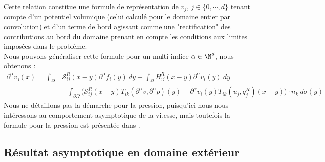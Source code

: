Cette relation constitue une formule de représentation de $v_j$, $j \in \{ 0, \cdots, d \}$ tenant compte d'un potentiel volumique (celui calculé pour le domaine entier par convolution) et d'un terme de bord agissant comme une "rectification" des contributions au bord du domaine prenant en compte les conditions aux limites imposées dans le problème.\\
Nous pouvons généraliser cette formule pour un multi-indice $\alpha \in \N^d$, nous obtenons :
\begin{align*}
    \partial^{\alpha}v_j(x) = \int_{\Omega}& \mathscr{S}_{ij}^R(x-y)\partial^{\alpha}f_i(y) \ dy - \int_{\Omega} H_{ij}^R(x-y)\partial^{\alpha}v_i(y) \ dy\\
    & - \int_{\partial \Omega} \Big( \mathscr{S}_{ij}^R(x-y)T_{ik}(\partial^{\alpha}v,\partial^{\alpha}p)(y) - \partial^{\alpha}v_i(y) T_{ik}(u_j,q_j^R)(x-y) \Big)\cdot n_k \ d\sigma(y) \label{representation_v}
\end{align*}
Nous ne détaillons pas la démarche pour la pression, puisqu'ici nous nous intéressons au comportement asymptotique de la vitesse, mais toutefois la formule pour la pression est présentée dans \cite{Galdi}.


\subsection{Résultat asymptotique en domaine extérieur}

